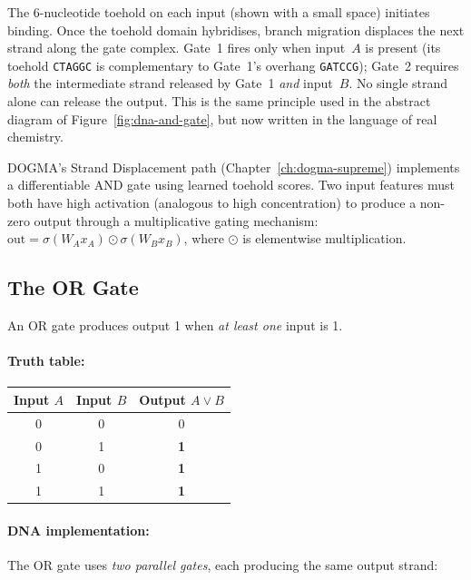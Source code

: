 The 6-nucleotide toehold on each input (shown with a small space) initiates binding.  Once the toehold domain hybridises, branch migration displaces the next strand along the gate complex.  Gate~1 fires only when input~$A$ is present (its toehold \texttt{CTAGGC} is complementary to Gate~1's overhang \texttt{GATCCG}); Gate~2 requires \emph{both} the intermediate strand released by Gate~1 \emph{and} input~$B$.  No single strand alone can release the output.  This is the same principle used in the abstract diagram of Figure~\ref{fig:dna-and-gate}, but now written in the language of real chemistry.

\begin{implnote}
DOGMA's Strand Displacement path (Chapter~\ref{ch:dogma-supreme}) implements a differentiable AND gate using learned toehold scores. Two input features must both have high activation (analogous to high concentration) to produce a non-zero output through a multiplicative gating mechanism: $\text{out} = \sigma(W_A x_A) \odot \sigma(W_B x_B)$, where $\odot$ is elementwise multiplication.
\end{implnote}

\subsection{The OR Gate}

An OR gate produces output 1 when \emph{at least one} input is 1.

\paragraph{Truth table:}
\begin{center}
\renewcommand{\arraystretch}{1.15}
\begin{tabular}{cc|c}
\toprule
\textbf{Input $A$} & \textbf{Input $B$} & \textbf{Output $A \vee B$} \\
\midrule
0 & 0 & 0 \\
0 & 1 & \textbf{1} \\
1 & 0 & \textbf{1} \\
1 & 1 & \textbf{1} \\
\bottomrule
\end{tabular}
\end{center}

\paragraph{DNA implementation:}
The OR gate uses \emph{two parallel gates}, each producing the same output strand:


